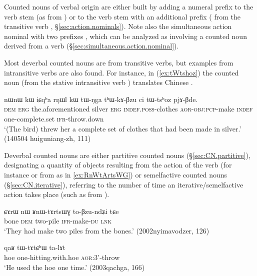 Counted nouns of verbal origin are either built by adding a numeral prefix to the verb stem (as  from ) or to the verb stem with an additional prefix  ( from the transitive verb , §\ref{sec:action.nominals}). Note also the simultaneous action nominal with two prefixes , which can be analyzed as involving a counted noun derived from a verb (§\ref{sec:simultaneous.action.nominal}). 

Most deverbal counted nouns are from transitive verbs, but examples from intransitive verbs are also found. For instance, in (\ref{ex:tWtshoz}) the counted noun  (from the stative intransitive verb ) translates Chinese .

\begin{exe}
\ex \label{ex:tWtshoz}
\gll nɯnɯ kɯ iɕqʰa rŋɯl kɯ tɯ-ŋga tʰɯ-kɤ-βzu ci tɯ-tsʰoz pjɤ-βde. \\
\textsc{dem} \textsc{erg} the.aforementioned silver \textsc{erg} \textsc{indef}.\textsc{poss}-clothes \textsc{aor}-\textsc{obj}:\textsc{pcp}-make \textsc{indef} one-complete.set \textsc{ifr}-throw.down \\
\glt `(The bird) threw her a complete set of clothes that had been made in silver.'  (140504 huiguniang-zh, 111)
\end{exe}

Deverbal counted nouns are either partitive counted nouns (§\ref{sec:CN.partitive}), designating a quantity of objects resulting from the action of the verb (for instance  or  from  as in \ref{ex:RnWtArtsWG}) or semelfactive counted nouns (§\ref{sec:CN.iterative}), referring to the number of time an iterative/semelfactive action takes place (such as  from ).

\begin{exe}
\ex \label{ex:RnWtArtsWG}
\gll ɕɤrɯ nɯ ʁnɯ-tɤrtsɯɣ to-βzu-ndʑi tɕe \\
bone \textsc{dem} two-pile \textsc{ifr}-make-\textsc{du} \textsc{lnk} \\
\glt `They had make two piles from the bones.' (2002nyimavodzer, 126)
\end{exe}

\begin{exe}
\ex \label{ex:tWtAtChW}
\gll qaʁ tɯ-tɤtɕʰɯ ta-lɤt  \\
hoe one-hitting.with.hoe \textsc{aor}:3'-throw \\
\glt `He used the hoe one time.' (2003qachga, 166)
\end{exe}

